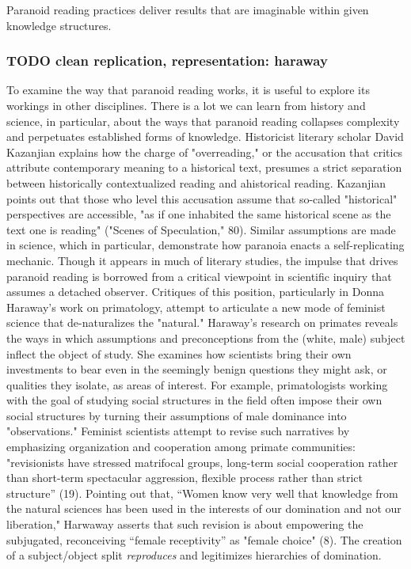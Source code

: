 \documentclass[11pt]{article}
\begin{document}
Paranoid reading practices deliver results that are imaginable within
given knowledge structures.

\subsubsection{{\bfseries\sffamily TODO} clean replication, representation: haraway}
\label{sec:org160ab67}

To examine the way that paranoid reading works, it is useful to
explore its workings in other disciplines. There is a lot we can learn
from history and science, in particular, about the ways that paranoid
reading collapses complexity and perpetuates established forms of
knowledge. Historicist literary scholar David Kazanjian explains how
the charge of "overreading," or the accusation that critics attribute
contemporary meaning to a historical text, presumes a strict
separation between historically contextualized reading and ahistorical
reading. Kazanjian points out that those who level this accusation
assume that so-called "historical" perspectives are accessible, "as if
one inhabited the same historical scene as the text one is reading"
("Scenes of Speculation," 80). Similar assumptions are made in
science, which in particular, demonstrate how paranoia enacts a
self-replicating mechanic. Though it appears in much of literary
studies, the impulse that drives paranoid reading is borrowed from a
critical viewpoint in scientific inquiry that assumes a detached
observer. Critiques of this position, particularly in Donna Haraway's
work on primatology, attempt to articulate a new mode of feminist
science that de-naturalizes the "natural." Haraway's research on
primates reveals the ways in which assumptions and preconceptions from
the (white, male) subject inflect the object of study. She examines
how scientists bring their own investments to bear even in the
seemingly benign questions they might ask, or qualities they isolate,
as areas of interest. For example, primatologists working with the
goal of studying social structures in the field often impose their own
social structures by turning their assumptions of male dominance into
"observations." Feminist scientists attempt to revise such narratives
by emphasizing organization and cooperation among primate communities:
"revisionists have stressed matrifocal groups, long-term social
cooperation rather than short-term spectacular aggression, flexible
process rather than strict structure” (19). Pointing out that, “Women
know very well that knowledge from the natural sciences has been used
in the interests of our domination and not our liberation," Harwaway
asserts that such revision is about empowering the subjugated,
reconceiving “female receptivity” as "female choice" (8). The creation
of a subject/object split \emph{reproduces} and legitimizes hierarchies of
domination.
\end{document}
